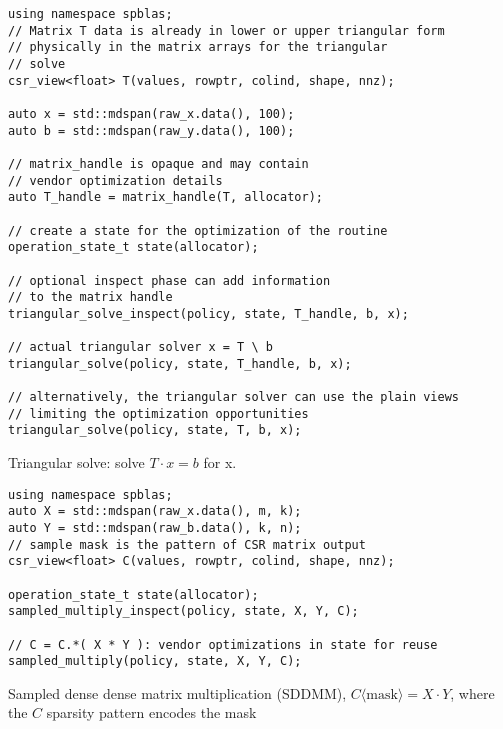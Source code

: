 \documentclass{article}
\begin{document}
\begin{listing}[H]
\begin{verbatim}
using namespace spblas;
// Matrix T data is already in lower or upper triangular form
// physically in the matrix arrays for the triangular
// solve
csr_view<float> T(values, rowptr, colind, shape, nnz);

auto x = std::mdspan(raw_x.data(), 100);
auto b = std::mdspan(raw_y.data(), 100);

// matrix_handle is opaque and may contain
// vendor optimization details
auto T_handle = matrix_handle(T, allocator);

// create a state for the optimization of the routine
operation_state_t state(allocator);

// optional inspect phase can add information
// to the matrix handle
triangular_solve_inspect(policy, state, T_handle, b, x);

// actual triangular solver x = T \ b
triangular_solve(policy, state, T_handle, b, x); 

// alternatively, the triangular solver can use the plain views
// limiting the optimization opportunities
triangular_solve(policy, state, T, b, x); 
\end{verbatim}
\caption{Triangular solve: solve $T\cdot x = b$ for x.}
\end{listing}


\begin{listing}[H]
\begin{verbatim}
using namespace spblas;
auto X = std::mdspan(raw_x.data(), m, k);
auto Y = std::mdspan(raw_b.data(), k, n);
// sample mask is the pattern of CSR matrix output
csr_view<float> C(values, rowptr, colind, shape, nnz);

operation_state_t state(allocator);
sampled_multiply_inspect(policy, state, X, Y, C);

// C = C.*( X * Y ): vendor optimizations in state for reuse
sampled_multiply(policy, state, X, Y, C); 

\end{verbatim}
\caption{Sampled dense dense matrix multiplication (SDDMM), $C\langle \text{mask} \rangle = X\cdot Y$, where the $C$ sparsity pattern encodes the mask}
\end{listing}



\iffalse
\begin{listing}[H]
\begin{verbatim}
using namespace spblas;
csr_view<float> A(values, rowptr, colind, shape, nnz);
// auto A = matrix_handle(csr_view<float>(...), allocator);
// ... likewise for B
csr_view<float> C(m, n);
// auto C = matrix_handle(csr_view<float>(...), allocator);

operation_state_t state(allocator);
multiply_elementwise_inspect(policy, state, A, B, C); // optional
multiply_elementwise_compute(policy, state, A, B, C);
index_t nnz = state.get_result_nnz();
// allocate C arrays and put in C
multiply_elementwise_fill(policy, state, A, B, C);
// C structure and values are now able to be used
\end{verbatim}
\caption{Element-wise Multiplication, $C = A~.*B$}
\end{listing}
\fi
\end{document}
